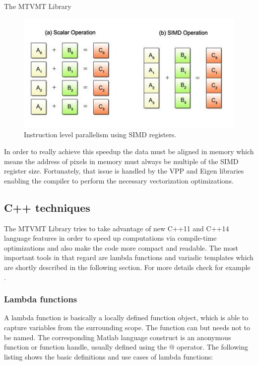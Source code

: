 \begin{chapter}{The MTVMT Library}
\begin{figure}[h!]
        \centering
	    \includegraphics[width=0.7\linewidth]{./figures/library/simd.jpg}
	\caption[SIMD parallelization]{Instruction level parallelism using SIMD registers.
	}
	\label{fig:simd}
\end{figure}

In order to really achieve this speedup the data must be aligned in memory which means the address of pixels in memory must always be multiple of the SIMD register size. Fortunately,
that issue is handled by the VPP and Eigen libraries enabling the compiler to perform the necessary vectorization optimizations.



\subsection{C++ techniques} %
\label{sub:C++ techniques}
The MTVMT Library tries to take advantage of new C++11 and C++14 language features in order to speed up computations via compile-time optimizations and also make the code
more compact and readable. The most important tools in that regard are lambda functions and variadic templates which are shortly described in the following section.
For more details check for example \cite{CPPEleven}.

\subsubsection{Lambda functions} %
\label{ssub:Lambda functions}
A lambda function is basically a locally defined function object, which is able to capture variables from the surrounding scope. The function can but needs not to be named.
The corresponding Matlab language construct is an anonymous function or function handle, usually defined using the @ operator. The following listing
shows the basic definitions and use cases of lambda functions:\\


\end{chapter}
